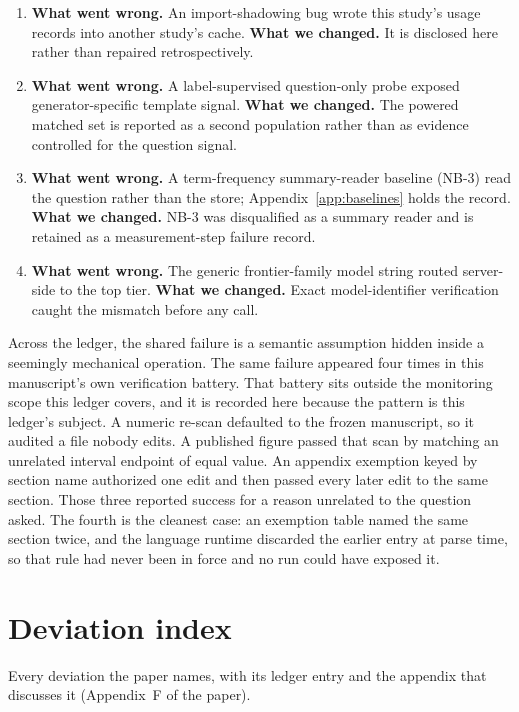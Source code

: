 \documentclass{article}
\begin{document}
\begin{enumerate}
\item %
\textbf{What went wrong.} An import-shadowing bug wrote this study's usage records into another study's cache. \textbf{What we changed.} It is disclosed here rather than repaired retrospectively.
\item
\textbf{What went wrong.} A label-supervised question-only probe exposed generator-specific template signal. \textbf{What we changed.} The powered matched set is reported as a second population rather than as evidence controlled for the question signal.
\item %
\textbf{What went wrong.} A term-frequency summary-reader baseline (NB-3) read the question rather than the store; Appendix~\ref{app:baselines} holds the record. \textbf{What we changed.} NB-3 was disqualified as a summary reader and is retained as a measurement-step failure record.
\item[Preventive.] %
\textbf{What went wrong.} The generic frontier-family model string routed server-side to the top tier. \textbf{What we changed.} Exact model-identifier verification caught the mismatch before any call.
\end{enumerate}

Across the ledger, the shared failure is a semantic assumption hidden inside a seemingly mechanical operation.
The same failure appeared four times in this manuscript's own verification battery.
That battery sits outside the monitoring scope this ledger covers, and it is recorded here because the pattern is this ledger's subject.
A numeric re-scan defaulted to the frozen manuscript, so it audited a file nobody edits.
A published figure passed that scan by matching an unrelated interval endpoint of equal value.
An appendix exemption keyed by section name authorized one edit and then passed every later edit to the same section.
Those three reported success for a reason unrelated to the question asked.
The fourth is the cleanest case: an exemption table named the same section twice, and the language runtime discarded the earlier entry at parse time, so that rule had never been in force and no run could have exposed it.

\section{Deviation index}\label{sup:deviations}

Every deviation the paper names, with its ledger entry and the appendix that discusses it (Appendix~F of the paper).
\end{document}
